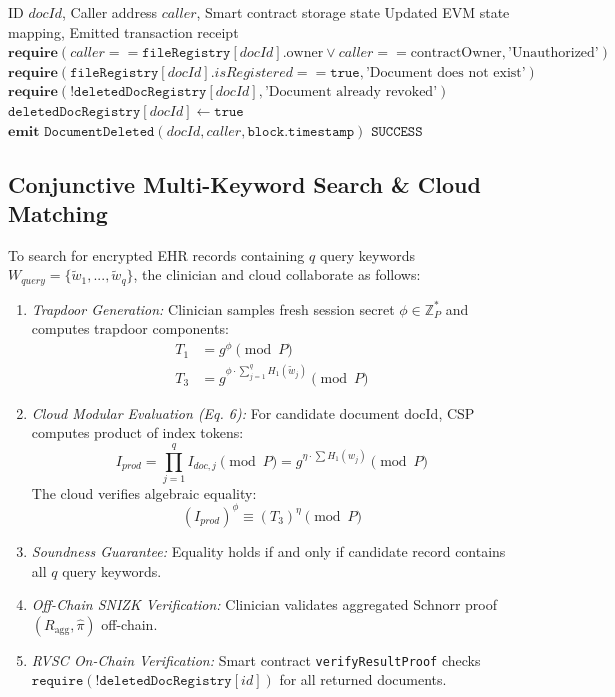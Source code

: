 \documentclass[journal,10pt,twocolumn]{IEEEtran}
\begin{document}
\begin{algorithm}[t]
\caption{Instant File Revocation (SingleDocDelete)}
\label{algo:del}
\begin{algorithmic}[1]
\REQUIRE ID $docId$, Caller address $caller$, Smart contract storage state
\ENSURE Updated EVM state mapping, Emitted transaction receipt
\STATE $\textbf{require}(caller == \texttt{fileRegistry}[docId].\text{owner} \lor caller == \text{contractOwner}, \text{'Unauthorized'})$
\STATE $\textbf{require}(\texttt{fileRegistry}[docId].isRegistered == \texttt{true}, \text{'Document does not exist'})$
\STATE $\textbf{require}(!\texttt{deletedDocRegistry}[docId], \text{'Document already revoked'})$
\STATE $\texttt{deletedDocRegistry}[docId] \leftarrow \texttt{true}$ 
\STATE $\textbf{emit } \texttt{DocumentDeleted}(docId, caller, \texttt{block.timestamp})$
\RETURN $\texttt{SUCCESS}$
\end{algorithmic}
\end{algorithm}

\subsection{Conjunctive Multi-Keyword Search \& Cloud Matching}
To search for encrypted EHR records containing $q$ query keywords $W_{query} = \{\tilde{w}_1, ..., \tilde{w}_q\}$, the clinician and cloud collaborate as follows:
\begin{enumerate}
    \item \textit{Trapdoor Generation:} Clinician samples fresh session secret $\phi \in \mathbb{Z}_P^*$ and computes trapdoor components:
    \begin{align}
    T_1 &= g^\phi \pmod P \\
    T_3 &= g^{\phi \cdot \sum_{j=1}^q H_1(\tilde{w}_j)} \pmod P
    \end{align}
    \item \textit{Cloud Modular Evaluation (Eq. 6):} For candidate document docId, CSP computes product of index tokens:
    \begin{equation}
    I_{prod} = \prod_{j=1}^q I_{doc,j} \pmod P = g^{\eta \cdot \sum H_1(w_j)} \pmod P
    \end{equation}
    The cloud verifies algebraic equality:
    \begin{equation}
    (I_{prod})^\phi \equiv (T_3)^\eta \pmod P
    \end{equation}
    \item \textit{Soundness Guarantee:} Equality holds if and only if candidate record contains all $q$ query keywords.
    \item \textit{Off-Chain SNIZK Verification:} Clinician validates aggregated Schnorr proof $(R_{\text{agg}}, \hat{\pi})$ off-chain.
    \item \textit{RVSC On-Chain Verification:} Smart contract \texttt{verifyResultProof} checks $\texttt{require}(!\texttt{deletedDocRegistry}[id])$ for all returned documents.
\end{enumerate}
\end{document}
